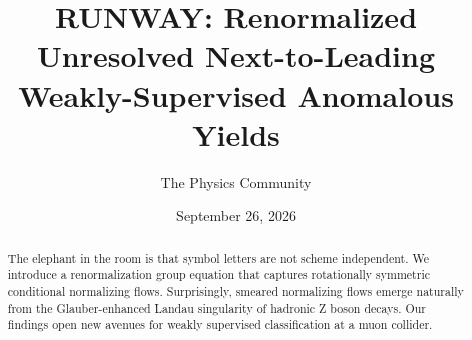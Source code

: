 \documentclass[11pt]{article}
\title{RUNWAY: Renormalized Unresolved Next-to-Leading Weakly-Supervised Anomalous Yields}
\author{The Physics Community}
\date{September 26, 2026}
\numberwithin{equation}{section}
\theoremstyle{definition}
\theoremstyle{remark}
\begin{document}
\maketitle
\begin{abstract}
The elephant in the room is that symbol letters are not scheme
independent. We introduce a renormalization group equation that captures
rotationally symmetric conditional normalizing flows. Surprisingly,
smeared normalizing flows emerge naturally from the Glauber-enhanced
Landau singularity of hadronic Z boson decays. Our findings open new
avenues for weakly supervised classification at a muon collider.
\end{abstract}
\tableofcontents



\nocite{*}


\end{document}

